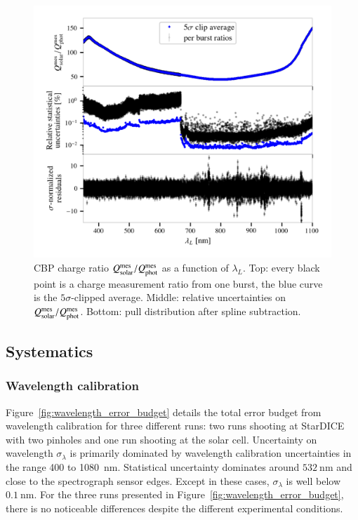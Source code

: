 \begin{figure}[!h]
\centering
\includegraphics[width=\columnwidth]{fig/cbp_charge_ratio.png}
\caption{CBP charge ratio $Q_{\mathrm{solar}}^{\mathrm{mes}}/Q_{\mathrm{phot}}^{\mathrm{mes}}$ as a function of $\lambda_L$. Top: every black point is a charge measurement ratio from one burst, the blue curve is the $5\sigma$-clipped average. Middle: relative uncertainties on $Q_{\mathrm{solar}}^{\mathrm{mes}}/Q_{\mathrm{phot}}^{\mathrm{mes}}$. Bottom: pull distribution after spline subtraction.}\label{fig:cbp_charge_ratio}
\end{figure}


\subsection{Systematics}



\subsubsection{Wavelength calibration}\label{sec:wavelength_syst}


Figure~\ref{fig:wavelength_error_budget} details the total error budget from wavelength calibration for three different runs: two runs shooting at StarDICE with two pinholes and one run shooting at the solar cell. Uncertainty on wavelength $\sigma_\lambda$ is primarily dominated by wavelength calibration uncertainties in the range 400 to \SI{1080}{\nm}. Statistical uncertainty dominates around $\SI{532}{\nm}$ and close to the spectrograph sensor edges. Except in these cases, $\sigma_\lambda$ is well below $\SI{0.1}{\nano\meter}$. For the three runs presented in Figure~\ref{fig:wavelength_error_budget}, there is no noticeable differences despite the different experimental conditions.

